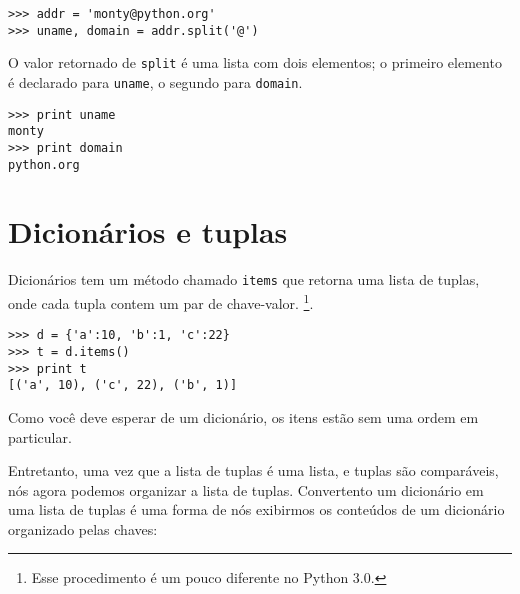 
\beforeverb
\begin{verbatim}
>>> addr = 'monty@python.org'
>>> uname, domain = addr.split('@')
\end{verbatim}
\afterverb
%
O valor retornado de {\tt split} é uma lista com dois elementos;
o primeiro elemento é declarado para {\tt uname}, o segundo para
{\tt domain}.

\beforeverb
\begin{verbatim}
>>> print uname
monty
>>> print domain
python.org
\end{verbatim}
\afterverb
%

\section{Dicionários e tuplas}


Dicionários tem um método chamado {\tt items} que retorna uma lista de tuplas,
onde cada tupla contem um par de chave-valor. \footnote{Esse procedimento é
um pouco diferente no Python 3.0.}.

\beforeverb
\begin{verbatim}
>>> d = {'a':10, 'b':1, 'c':22}
>>> t = d.items()
>>> print t
[('a', 10), ('c', 22), ('b', 1)]
\end{verbatim}
\afterverb
%
Como você deve esperar de um dicionário, os itens estão sem uma ordem em
particular.

Entretanto, uma vez que a lista de tuplas é uma lista, e tuplas são
comparáveis, nós agora podemos organizar a lista de tuplas. Convertento
um dicionário em uma lista de tuplas é uma forma de nós exibirmos os
conteúdos de um dicionário organizado pelas chaves:

